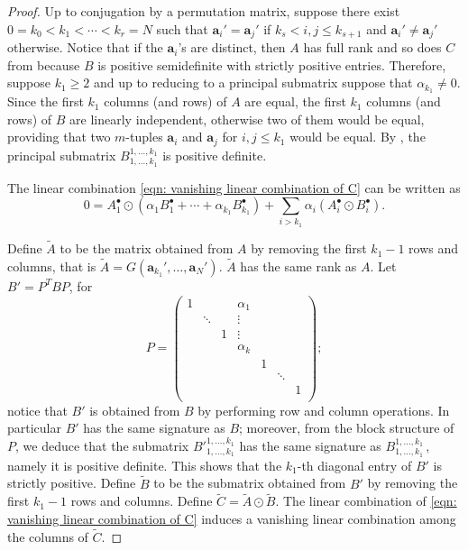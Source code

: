 \documentclass{toc}
\newcommand{\vvirg}{ , \dots , }
\newcommand{\textsum}{{\textstyle \sum}}
\newcommand{\bfa}{\mathbf{a}}
\renewcommand{\tilde}[1]{\widetilde{#1}}
\begin{document}
\begin{proof}
Up to conjugation by a permutation matrix, suppose there exist $0 = k_0 < k_1 < \cdots < k_r=N$ such that $\bfa_i' = \bfa_j'$ if $k_s < i,j \leq k_{s+1}$ and $\bfa_i' \neq \bfa_j'$ otherwise. Notice that if the $\bfa_i$'s are distinct, then $A$ has full rank and so does $C$ from  because $B$ is positive semidefinite with strictly positive entries. Therefore, suppose $k_1 \geq 2$ and up to reducing to a principal submatrix suppose that $\alpha_{k_1} \neq 0$. Since the first $k_1$ columns (and rows) of $A$ are equal, the first $k_1$ columns (and rows) of $B$ are linearly independent, otherwise two of them would be equal, providing that two $m$-tuples $\bfa_i$ and $\bfa_j$ for $i,j \leq k_1$ would be equal. By , the principal submatrix $B^{1\vvirg k_1}_{1 \vvirg k_1}$ is positive definite.

The linear combination \eqref{eqn: vanishing linear combination of C} can be written as 
\[
 0 = A^\bullet_1 \odot(\alpha_1 B^\bullet_1 + \cdots + \alpha_{k_1} B^\bullet_{k_1}) + \textsum_{i > k_1} \alpha_i (A^\bullet_i \odot B^\bullet_i).
\]

Define $\tilde{A}$ to be the matrix obtained from $A$ by removing the first $k_1-1$ rows and columns, that is $\tilde{A} = G(\bfa_{k_1}' \vvirg \bfa_N')$. $\tilde{A}$ has the same rank as $A$. Let $B' = P^T B P$, for
\[
 P = \left( \begin{array}{ccccccc}
              1 & & & \alpha_1& & & \\
              & \ddots & & \vdots & & & \\
              & & 1 & \vdots & & & \\
              & & & \alpha_k& & & \\
              & & & & 1 & & \\
              & & & & & \ddots & \\
              & & & & & & 1\\
            \end{array}
 \right);
\]
notice that $B'$ is obtained from $B$ by performing row and column operations. In particular $B'$ has the same signature as $B$; moreover, from the block structure of $P$, we deduce that the submatrix ${B'}^{1 \vvirg k_1}_ { 1\vvirg k_1}$ has the same signature as $B^{1 \vvirg k_1}_ { 1\vvirg k_1}$\,, namely it is positive definite. This shows that the $k_1$-th diagonal entry of $B'$ is strictly positive. Define $\tilde{B}$ to be the submatrix obtained from $B'$ by removing the first $k_1-1$ rows and columns. Define $\tilde{C} = \tilde{A} \odot \tilde{B}$. The linear combination of \eqref{eqn: vanishing linear combination of C} induces a vanishing linear combination among the columns of $\tilde{C}$. 


\end{proof}
\end{document}
